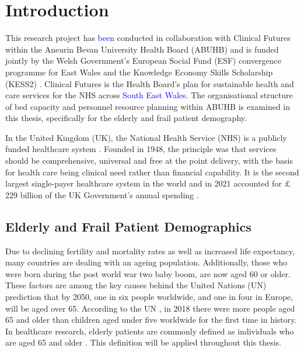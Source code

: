 \documentclass[../thesis.tex]{subfiles}
\begin{document}
\chapter{Introduction}\label{chp:Introduction}

This research project has \textcolor{blue}{been} conducted in collaboration with Clinical Futures within the Aneurin Bevan University Health Board (ABUHB) \cite{UniAneurinBevanHealthBoard} and is funded jointly by the Welsh Government's European Social Fund (ESF) convergence programme for East Wales and the Knowledge Economy Skills Scholarship (KESS2) \cite{KESS2023}. Clinical Futures is the Health Board's plan for sustainable health and care services for the NHS across \textcolor{blue}{South East Wales}. The organisational structure of bed capacity and personnel resource planning within ABUHB is examined in this thesis, specifically for the elderly and frail patient demography.

In the United Kingdom (UK), the National Health Service (NHS) is a publicly funded healthcare system \cite{Welch2018}. Founded in 1948, the principle was that services should be comprehensive, universal and free at the point delivery, with the basis for health care being clinical need rather than financial capability. It is the second largest single-payer healthcare system in the world and in 2021 accounted for $\pounds$229 billion of the UK Government's annual spending \cite{ONS2022a}.


\section{Elderly and Frail Patient Demographics}\label{sec:elderlyfrail}
Due to declining fertility and mortality rates as well as increased life expectancy, many countries are dealing with an ageing population. Additionally, those who were born during the post world war two baby boom, are now aged 60 or older. These factors are among the key causes behind the United Nations 
(UN) prediction that by 2050, one in six people worldwide, and one in four in Europe, will be aged over 65. According to the UN \cite{UN3}, in 2018 there were more people aged 65 and older than children aged under five worldwide for the first time in history. In healthcare research, elderly patients are commonly defined as individuals who are aged 65 and older \cite{Crews2006,GOV.UK2001,NHSEngland,Orimo2006}. This definition will be applied throughout this thesis. 
\end{document}
